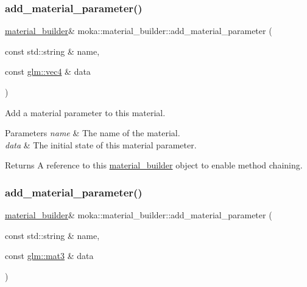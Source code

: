 \subsubsection{\texorpdfstring{add\_material\_parameter()}{add\_material\_parameter()}\hspace{0.1cm}{\footnotesize\ttfamily [5/7]}}
{\footnotesize\ttfamily \mbox{\hyperlink{classmoka_1_1material__builder}{material\+\_\+builder}}\& moka\+::material\+\_\+builder\+::add\+\_\+material\+\_\+parameter (\begin{DoxyParamCaption}\item[{const std\+::string \&}]{name,  }\item[{const \mbox{\hyperlink{namespacemoka_aed2224bc0e5b79e57a8975ded94ee1aaa1a9028fd802c481a99491a418ca2fe86}{glm\+::vec4}} \&}]{data }\end{DoxyParamCaption})}



Add a material parameter to this material. 


\begin{DoxyParams}{Parameters}
{\em name} & The name of the material. \\
\hline
{\em data} & The initial state of this material parameter. \\
\hline
\end{DoxyParams}
\begin{DoxyReturn}{Returns}
A reference to this \mbox{\hyperlink{classmoka_1_1material__builder}{material\+\_\+builder}} object to enable method chaining. 
\end{DoxyReturn}
\mbox{\label{classmoka_1_1material__builder_a12f85b4426611e3b929ea19f8957d0f3}} 
\subsubsection{\texorpdfstring{add\_material\_parameter()}{add\_material\_parameter()}\hspace{0.1cm}{\footnotesize\ttfamily [6/7]}}
{\footnotesize\ttfamily \mbox{\hyperlink{classmoka_1_1material__builder}{material\+\_\+builder}}\& moka\+::material\+\_\+builder\+::add\+\_\+material\+\_\+parameter (\begin{DoxyParamCaption}\item[{const std\+::string \&}]{name,  }\item[{const \mbox{\hyperlink{namespacemoka_aed2224bc0e5b79e57a8975ded94ee1aaa0dd87e9dfdea657e8be233b5836821d0}{glm\+::mat3}} \&}]{data }\end{DoxyParamCaption})}



